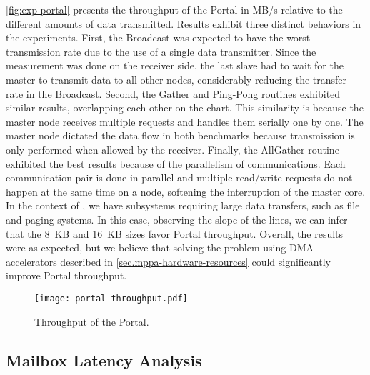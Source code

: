 			\autoref{fig:exp-portal} presents the throughput of the Portal in MB/s
			relative to the different amounts of data transmitted. Results exhibit
			three distinct behaviors in the experiments. First, the Broadcast was
			expected to have the worst transmission rate due to the use of a single
			data transmitter. Since the measurement was done on the receiver side,
			the last slave had to wait for the master to transmit data to all other nodes,
			considerably reducing the transfer rate in the Broadcast. Second, the
			Gather and Ping-Pong routines exhibited similar results, overlapping
			each other on the chart. This similarity is because the master node
			receives multiple requests and handles them serially one by one.
			The master node dictated the data flow in both benchmarks because
			transmission is only performed when allowed by the receiver. Finally,
			the AllGather routine exhibited the best results because of the
			parallelism of communications. Each communication pair is done in parallel
			and multiple read/write requests do not happen at the same time on a node,
			softening the interruption of the master core. In the context of \oss,
			we have subsystems requiring large data transfers, such as file and
			paging systems. In this case, observing the slope of the lines,
			we can infer that the 8~KB and 16~KB sizes favor Portal throughput.
			Overall, the results were as expected, but we believe that solving
			the problem using DMA accelerators described in
			\autoref{sec.mppa-hardware-resources} could significantly improve
			Portal throughput.

			\begin{figure}[!tb]
				\centering%
				\caption{Throughput of the Portal.}%
				\label{fig:exp-portal}%
				\texttt{[image: portal-throughput.pdf]}%
			\end{figure}

		\subsection{Mailbox Latency Analysis}

